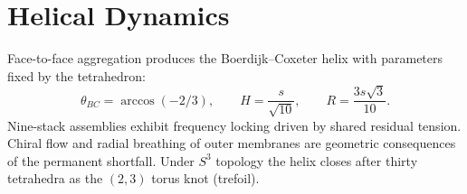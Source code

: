 \section{Helical Dynamics}
\label{sec:helix}

Face-to-face aggregation produces the Boerdijk--Coxeter helix with parameters fixed
by the tetrahedron:
\[
\theta_{BC}=\arccos(-2/3),\qquad H=\frac{s}{\sqrt{10}},\qquad R=\frac{3s\sqrt{3}}{10}.
\]
Nine-stack assemblies exhibit frequency locking driven by shared residual tension.
Chiral flow and radial breathing of outer membranes are geometric consequences of
the permanent shortfall. Under $S^3$ topology the helix closes after thirty
tetrahedra as the $(2,3)$ torus knot (trefoil).
